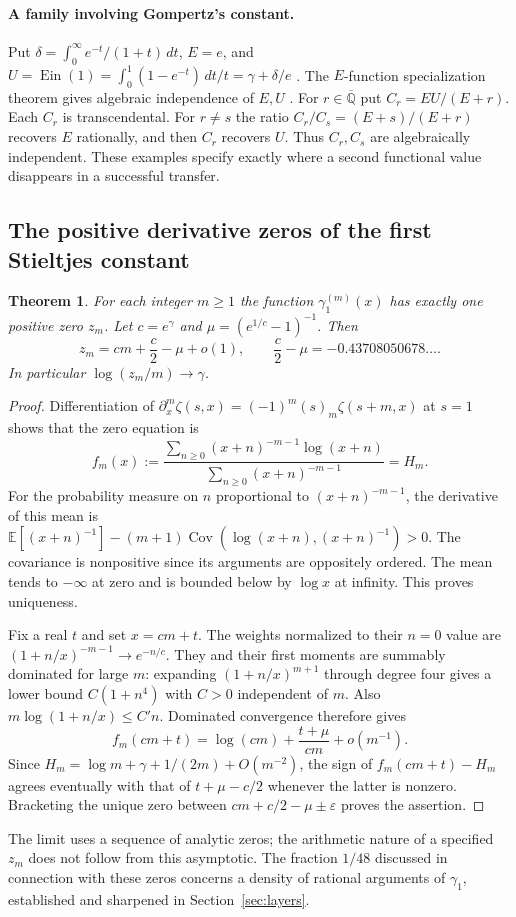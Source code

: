 \documentclass[11pt,a4paper]{article}
\newtheorem{theorem}{Theorem}[section]
\theoremstyle{definition}\newtheorem{definition}[theorem]{Definition}\newtheorem{example}[theorem]{Example}
\theoremstyle{remark}\newtheorem{remark}[theorem]{Remark}
\newcommand{\Q}{\mathbb Q}\newcommand{\Z}{\mathbb Z}\newcommand{\R}{\mathbb R}\newcommand{\N}{\mathbb N}
\begin{document}
\paragraph{A family involving Gompertz's constant.}
Put $\delta=\int_0^\infty e^{-t}/(1+t)\,dt$, $E=e$, and $U=\operatorname{Ein}(1)=\int_0^1(1-e^{-t})\,dt/t=\gamma+\delta/e$ \cite{Rivoal}. The $E$-function specialization theorem gives algebraic independence of $E,U$ \cite{Rivoal}. For $r\in\overline{\Q}$ put $C_r=EU/(E+r)$. Each $C_r$ is transcendental. For $r\ne s$ the ratio $C_r/C_s=(E+s)/(E+r)$ recovers $E$ rationally, and then $C_r$ recovers $U$. Thus $C_r,C_s$ are algebraically independent. These examples specify exactly where a second functional value disappears in a successful transfer.

\subsection{The positive derivative zeros of the first Stieltjes constant}
\begin{theorem}\label{thm:derivative}
For each integer $m\ge1$ the function $\gamma_1^{(m)}(x)$ has exactly one positive zero $z_m$. Let $c=e^\gamma$ and $\mu=(e^{1/c}-1)^{-1}$. Then
\[
z_m=c m+\frac c2-\mu+o(1),\qquad \frac c2-\mu=-0.43708050678\ldots .
\]
In particular $\log(z_m/m)\to\gamma$.
\end{theorem}
\begin{proof}
Differentiation of $\partial_x^m\zeta(s,x)=(-1)^m(s)_m\zeta(s+m,x)$ at $s=1$ shows that the zero equation is
\[
f_m(x):=\frac{\sum_{n\ge0}(x+n)^{-m-1}\log(x+n)}
{\sum_{n\ge0}(x+n)^{-m-1}}=H_m.
\]
For the probability measure on $n$ proportional to $(x+n)^{-m-1}$, the derivative of this mean is
$\mathbb E[(x+n)^{-1}]-(m+1)\operatorname{Cov}(\log(x+n),(x+n)^{-1})>0$.
The covariance is nonpositive since its arguments are oppositely ordered. The mean tends to $-\infty$ at zero and is bounded below by $\log x$ at infinity. This proves uniqueness.

Fix a real $t$ and set $x=c m+t$. The weights normalized to their $n=0$ value are $(1+n/x)^{-m-1}\to e^{-n/c}$. They and their first moments are summably dominated for large $m$: expanding $(1+n/x)^{m+1}$ through degree four gives a lower bound $C(1+n^4)$ with $C>0$ independent of $m$. Also $m\log(1+n/x)\le C'n$. Dominated convergence therefore gives
\[
f_m(c m+t)=\log(cm)+\frac{t+\mu}{cm}+o(m^{-1}).
\]
Since $H_m=\log m+\gamma+1/(2m)+O(m^{-2})$, the sign of $f_m(cm+t)-H_m$ agrees eventually with that of $t+\mu-c/2$ whenever the latter is nonzero. Bracketing the unique zero between $cm+c/2-\mu\pm\varepsilon$ proves the assertion.
\end{proof}
The limit uses a sequence of analytic zeros; the arithmetic nature of a specified $z_m$ does not follow from this asymptotic. The fraction $1/48$ discussed in connection with these zeros concerns a density of rational arguments of $\gamma_1$, established and sharpened in Section~\ref{sec:layers}.
\end{document}
